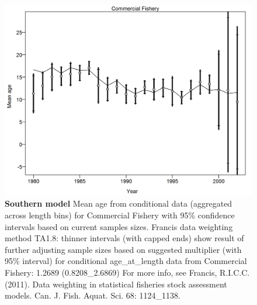 \documentclass[12pt,]{article}
\begin{document}
\begin{figure}[htbp]
\centering
\includegraphics{./tex2pdf.8516/4d0f68c305256be4252697e76023a72dfa6c62c2.png}
\caption{\textbf{Southern model} Mean age from conditional data
(aggregated across length bins) for Commercial Fishery with 95\%
confidence intervals based on current samples sizes. Francis data
weighting method TA1.8: thinner intervals (with capped ends) show result
of further adjusting sample sizes based on suggested multiplier (with
95\% interval) for conditional age\_at\_length data from Commercial
Fishery: 1.2689 (0.8208\_2.6869) For more info, see Francis, R.I.C.C.
(2011). Data weighting in statistical fisheries stock assessment models.
Can. J. Fish. Aquat. Sci. 68: 1124\_1138.
\label{fig:mod2_4_comp_condAALfit_data_weighting_TA1.8_condAgeCommercial Fishery}}
\end{figure}
\end{document}
